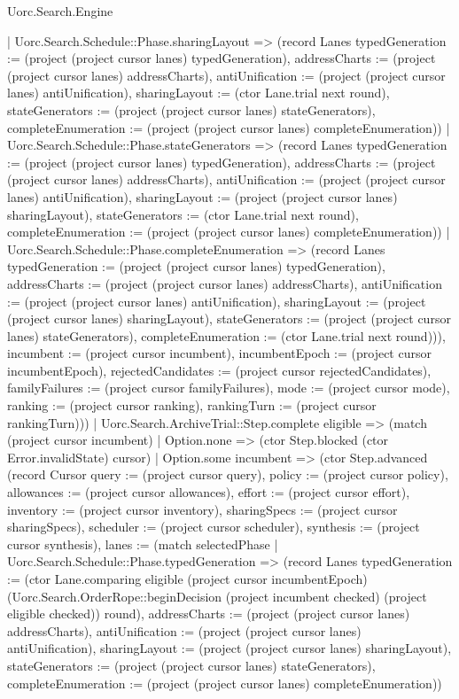 \begin{lexlean}{Uorc.Search.Engine}
\begin{semanticmodule}
{{        | Uorc.Search.Schedule::Phase.sharingLayout => (record Lanes {typedGeneration := (project (project cursor lanes) typedGeneration), addressCharts := (project (project cursor lanes) addressCharts), antiUnification := (project (project cursor lanes) antiUnification), sharingLayout := (ctor Lane.trial next round), stateGenerators := (project (project cursor lanes) stateGenerators), completeEnumeration := (project (project cursor lanes) completeEnumeration)})
        | Uorc.Search.Schedule::Phase.stateGenerators => (record Lanes {typedGeneration := (project (project cursor lanes) typedGeneration), addressCharts := (project (project cursor lanes) addressCharts), antiUnification := (project (project cursor lanes) antiUnification), sharingLayout := (project (project cursor lanes) sharingLayout), stateGenerators := (ctor Lane.trial next round), completeEnumeration := (project (project cursor lanes) completeEnumeration)})
        | Uorc.Search.Schedule::Phase.completeEnumeration => (record Lanes {typedGeneration := (project (project cursor lanes) typedGeneration), addressCharts := (project (project cursor lanes) addressCharts), antiUnification := (project (project cursor lanes) antiUnification), sharingLayout := (project (project cursor lanes) sharingLayout), stateGenerators := (project (project cursor lanes) stateGenerators), completeEnumeration := (ctor Lane.trial next round)})), incumbent := (project cursor incumbent), incumbentEpoch := (project cursor incumbentEpoch), rejectedCandidates := (project cursor rejectedCandidates), familyFailures := (project cursor familyFailures), mode := (project cursor mode), ranking := (project cursor ranking), rankingTurn := (project cursor rankingTurn)}))
      | Uorc.Search.ArchiveTrial::Step.complete eligible => (match (project cursor incumbent)
        | Option.none => (ctor Step.blocked (ctor Error.invalidState) cursor)
        | Option.some incumbent => (ctor Step.advanced (record Cursor {query := (project cursor query), policy := (project cursor policy), allowances := (project cursor allowances), effort := (project cursor effort), inventory := (project cursor inventory), sharingSpecs := (project cursor sharingSpecs), scheduler := (project cursor scheduler), synthesis := (project cursor synthesis), lanes := (match selectedPhase
          | Uorc.Search.Schedule::Phase.typedGeneration => (record Lanes {typedGeneration := (ctor Lane.comparing eligible (project cursor incumbentEpoch) (Uorc.Search.OrderRope::beginDecision (project incumbent checked) (project eligible checked)) round), addressCharts := (project (project cursor lanes) addressCharts), antiUnification := (project (project cursor lanes) antiUnification), sharingLayout := (project (project cursor lanes) sharingLayout), stateGenerators := (project (project cursor lanes) stateGenerators), completeEnumeration := (project (project cursor lanes) completeEnumeration)})
}}
\end{semanticmodule}
\end{lexlean}
